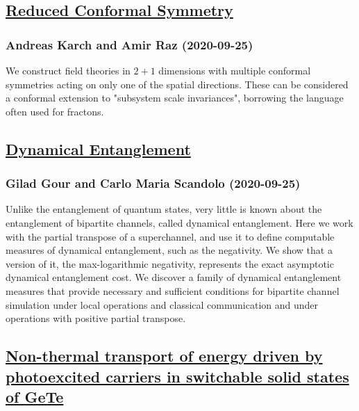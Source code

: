 \subsection*{\href{http://arxiv.org/abs/2009.12308v1}{Reduced Conformal Symmetry}}
\subsubsection*{Andreas Karch and Amir Raz (2020-09-25)}
We construct field theories in $2+1$ dimensions with multiple conformal
symmetries acting on only one of the spatial directions. These can be
considered a conformal extension to "subsystem scale invariances", borrowing
the language often used for fractons.

\subsection*{\href{http://arxiv.org/abs/2009.12304v1}{Dynamical Entanglement}}
\subsubsection*{Gilad Gour and Carlo Maria Scandolo (2020-09-25)}
Unlike the entanglement of quantum states, very little is known about the
entanglement of bipartite channels, called dynamical entanglement. Here we work
with the partial transpose of a superchannel, and use it to define computable
measures of dynamical entanglement, such as the negativity. We show that a
version of it, the max-logarithmic negativity, represents the exact asymptotic
dynamical entanglement cost. We discover a family of dynamical entanglement
measures that provide necessary and sufficient conditions for bipartite channel
simulation under local operations and classical communication and under
operations with positive partial transpose.

\subsection*{\href{http://arxiv.org/abs/2009.12302v1}{Non-thermal transport of energy driven by photoexcited carriers in  switchable solid states of GeTe}}
